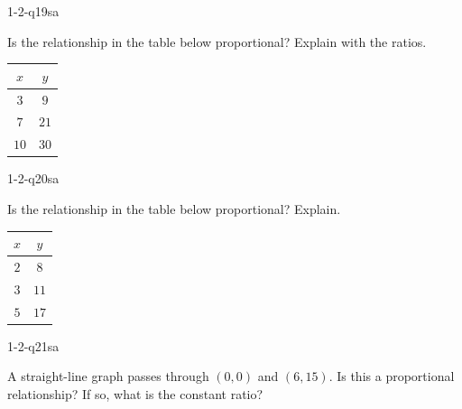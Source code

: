 
\begin{practiceQuestion}{1-2-q19}{sa}
\begin{questionText}
Is the relationship in the table below proportional? Explain with the ratios.

\begin{center}
\begin{tabular}{|c|c|}
\hline $x$ & $y$ \\ \hline $3$ & $9$ \\ $7$ & $21$ \\ $10$ & $30$ \\ \hline
\end{tabular}
\end{center}
\end{questionText}
\end{practiceQuestion}

\begin{practiceQuestion}{1-2-q20}{sa}
\begin{questionText}
Is the relationship in the table below proportional? Explain.

\begin{center}
\begin{tabular}{|c|c|}
\hline $x$ & $y$ \\ \hline $2$ & $8$ \\ $3$ & $11$ \\ $5$ & $17$ \\ \hline
\end{tabular}
\end{center}
\end{questionText}
\end{practiceQuestion}

\begin{practiceQuestion}{1-2-q21}{sa}
\begin{questionText}
A straight-line graph passes through $(0, 0)$ and $(6, 15)$. Is this a proportional relationship? If so, what is the constant ratio?
\end{questionText}
\end{practiceQuestion}

